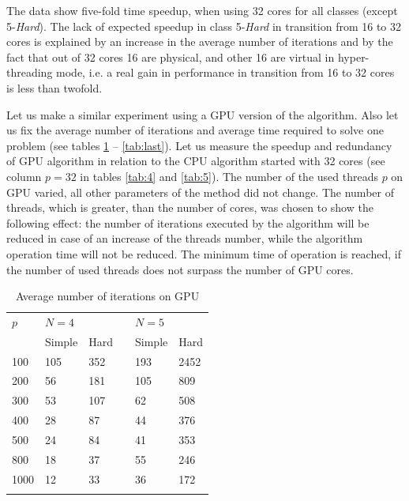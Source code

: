 \documentclass[smallcondensed]{svjour3}     %
\begin{document}
The data show five-fold time speedup, when using 32 cores for all classes (except 5-\textit{Hard}). The lack of expected speedup in class 5-\textit{Hard} in transition from 16 to 32 cores is explained by an increase in the average number of iterations and by the fact that out of 32 cores 16 are physical, and other 16 are virtual in hyper-threading mode, i.e. a real gain in performance in transition from 16 to 32 cores is less than twofold.

Let us make a similar experiment using a GPU version of the algorithm. Also let us fix the average number of iterations and average time required to solve one problem (see tables \ref{tab:last4} -- \ref{tab:last}). Let us measure the speedup and redundancy of GPU algorithm in relation to the CPU algorithm started with 32 cores (see column $p=32$ in tables \ref{tab:4} and \ref{tab:5}). The number of the used threads $p$ on GPU varied, all other parameters of the method did not change. The number of threads, which is greater, than the number of cores, was chosen to show the following effect: the number of iterations executed by the algorithm will be reduced in case of an increase of the threads number, while the algorithm operation time will not be reduced. The minimum time of operation is reached, if the number of used threads does not surpass the number of GPU cores.


\begin{table}
	\caption{Average number of iterations on GPU}
	\label{tab:last4}
	\center
	\begin{tabular}{llllll}
		\hline\noalign{\smallskip}
		$p$ & \multicolumn{2}{l}{ $N=4$ } & & \multicolumn{2}{l}{$N=5$} \\
		\noalign{\smallskip} \cline{2-3} \cline{5-6} \noalign{\smallskip}
		 & Simple & Hard & & Simple & Hard  \\
		\noalign{\smallskip} \hline \noalign{\smallskip}		
100 &	105 &	352 & &	193  &	2452 \\
200 &	56 &	181 & &	105  &	809 \\
300 &	53 &	107 & & 62  &	508 \\
400 &	28 &	87 & &	44  &	376 \\
500 &	24 &	84 & &	41  &	353 \\
800 &	18 &	37 & &	55 &	246 \\
1000 &	12 &	33 & &	36 &	172 \\
		\noalign{\smallskip}\hline
	\end{tabular}
\end{table}
\end{document}
